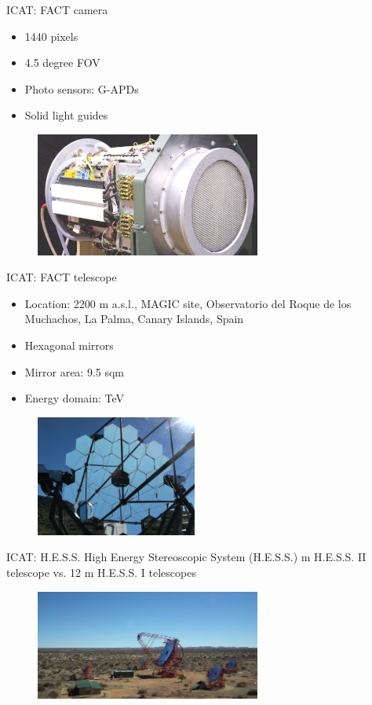 \documentclass{beamer}
\begin{document}
\begin{frame}{ICAT: FACT camera}
	\begin{itemize}
		\item 1440 pixels
		\item 4.5 degree FOV
		\item Photo sensors: G-APDs
		\item Solid light guides
	\end{itemize}
	\begin{figure}[h]
		\includegraphics[width=280px]{ICATcamera.jpg}
	\end{figure}
\end{frame}



\begin{frame}{ICAT: FACT telescope}
	\begin{itemize}
		\item Location: 2200 m a.s.l., MAGIC site, Observatorio del Roque de los Muchachos, La Palma, Canary Islands, Spain
		\item Hexagonal mirrors
		\item Mirror area: 9.5 sqm
		\item Energy domain: TeV
	\end{itemize}
	\begin{figure}[h]
		\includegraphics[width=200px]{FACTtelescope.jpg}
	\end{figure}
\end{frame}




\begin{frame}{ICAT: H.E.S.S.}
	High Energy Stereoscopic System (H.E.S.S.)
	 m H.E.S.S. II telescope vs. 12 m H.E.S.S. I telescopes
	\begin{figure}[h]
		\includegraphics[width=280px]{Array_overviewS.jpg}
	\end{figure}
\end{frame}
\end{document}

